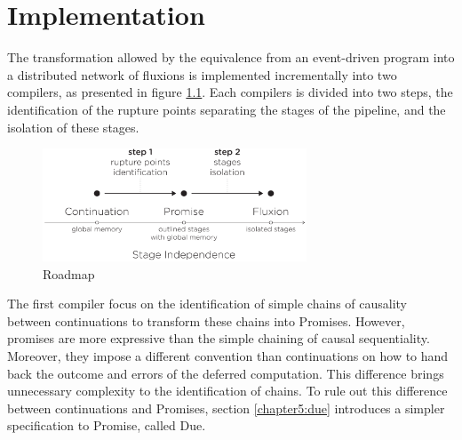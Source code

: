 \chapter{Implementation} \label{chapter5}
\minitoc
\eject
The transformation allowed by the equivalence from an event-driven program into a distributed network of fluxions is implemented incrementally into two compilers, as presented in figure \ref{fig:roadmap}.
Each compilers is divided into two steps, the identification of the rupture points separating the stages of the pipeline, and the isolation of these stages.

\begin{figure}[h!]
\begin{center}
\includegraphics[width=0.7\textwidth]{../resources/roadmap.pdf}
\end{center}
\caption{Roadmap}
\label{fig:roadmap}
\end{figure}

The first compiler focus on the identification of simple chains of causality between continuations to transform these chains into Promises.
However, promises are more expressive than the simple chaining of causal sequentiality.
Moreover, they impose a different convention than continuations on how to hand back the outcome and errors of the deferred computation.
This difference brings unnecessary complexity to the identification of chains.
To rule out this difference between continuations and Promises, section \ref{chapter5:due} introduces a simpler specification to Promise, called Due.

